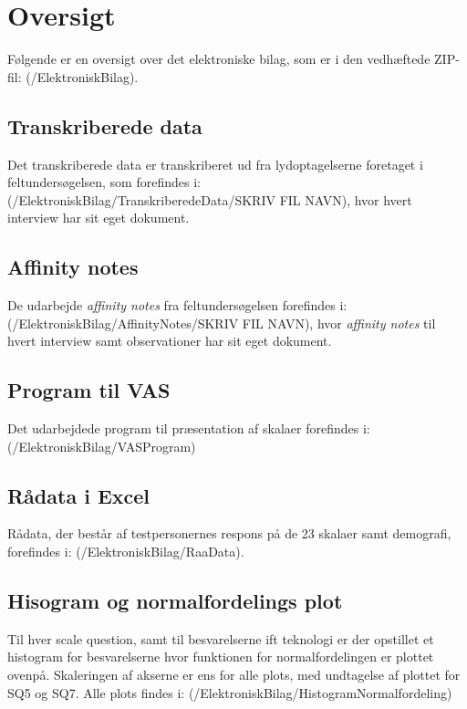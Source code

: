 \chapter{Oversigt}
\label{ElektroniskBilagOversigt}
%
Følgende er en oversigt over det elektroniske bilag, som er i den vedhæftede ZIP-fil: (/ElektroniskBilag).

\section{Transkriberede data}
\label{ElektroniskBilagTranskriberede}
%
Det transkriberede data er transkriberet ud fra lydoptagelserne foretaget i feltundersøgelsen, som forefindes i: (/ElektroniskBilag/TranskriberedeData/SKRIV FIL NAVN), hvor hvert interview har sit eget dokument. 

\section{Affinity notes}
\label{ElektroniskBilagAffinityNotes}
%
De udarbejde \textit{affinity notes} fra feltundersøgelsen forefindes i: (/ElektroniskBilag/AffinityNotes/SKRIV FIL NAVN), hvor \textit{affinity notes} til hvert interview samt observationer har sit eget dokument. 

\section{Program til VAS}
\label{ElektroniskBilagProgram}
%
Det udarbejdede program til præsentation af skalaer forefindes i: (/ElektroniskBilag/VASProgram)

\section{Rådata i Excel}
\label{ElektroniskBilagExcel}
%
Rådata, der består af testpersonernes respons på de 23 skalaer samt demografi, forefindes i: (/ElektroniskBilag/RaaData).

\section{Hisogram og normalfordelings plot}
\label{ElektroniskBilagHistNormal}
%
Til hver scale question, samt til besvarelserne ift teknologi er der opstillet et histogram for besvarelserne hvor funktionen for normalfordelingen er plottet ovenpå.  
Skaleringen af akserne er ens for alle plots, med undtagelse af plottet for SQ5 og SQ7. Alle plots findes i: (/ElektroniskBilag/HistogramNormalfordeling)


